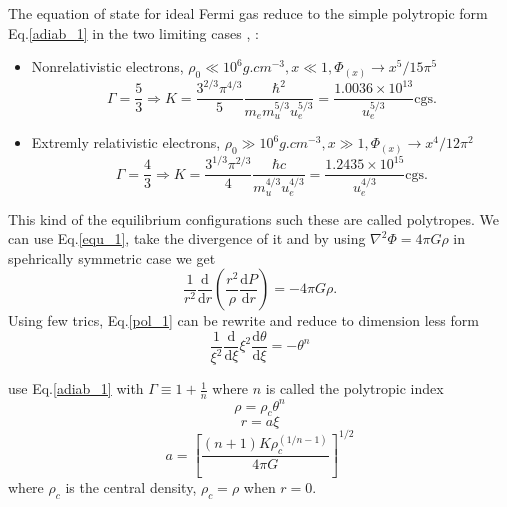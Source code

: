 \documentclass[oneside,a4paper,11pt]{report}
\begin{document}
The equation of state for ideal Fermi gas reduce to the simple polytropic form Eq.\eqref{adiab_1} in
the two limiting cases \citet{2004bhwd.book.....S}, \citet{padm_vII}:
\begin{itemize}
\item Nonrelativistic electrons, $\rho_0 \ll 10^6 g.cm^{-3}, x\ll 1, \Phi_{(x)}\rightarrow x^5/15\pi^5 $
\begin{equation}
\Gamma = \frac{5}{3} \Longrightarrow  K = \frac{3^{2/3}\pi^{4/3}}{5}\frac{\hbar^2}{m_em_u^{5/3}u_e^{5/3}} = \frac{1.0036\times 10^{13}}{u_e^{5/3}} \mathrm{cgs}.
\end{equation}
\item Extremly relativistic electrons, $\rho_0 \gg 10^6 g.cm^{-3}, x\gg 1, \Phi_{(x)}\rightarrow x^4/12\pi^2 $
\begin{equation}
\Gamma = \frac{4}{3} \Longrightarrow K = \frac{3^{1/3}\pi^{2/3}}{4}\frac{\hbar c}{m_u^{4/3}u_e^{4/3}} = \frac{1.2435\times 10^{15}}{u_e^{4/3}} \mathrm{cgs}.
\end{equation}
\end{itemize}

This kind of the equilibrium configurations such these are called polytropes. We can use Eq.\eqref{equ_1}, take the divergence of it and by using $\nabla^2\Phi = 4\pi G \rho$ in spehrically 
symmetric case we get  
\begin{equation}
\label{pol_1}
 \frac{1}{r^2}\frac{\mathrm{d}}{\mathrm{d}r}\left ( \frac{r^2}{\rho}\frac{\mathrm{d}P}{\mathrm{d}r} \right ) = -4\pi G\rho .
\end{equation}
Using few trics, Eq.\eqref{pol_1} can be rewrite and reduce to dimension less form 
\begin{equation}
 \label{pol_2}
\frac{1}{\xi^2 }\frac{\mathrm{d}}{\mathrm{d}\xi}\xi^2\frac{\mathrm{d}\theta }{\mathrm{d}\xi } = -\theta^n 
\end{equation}



use Eq.\eqref{adiab_1} with $\Gamma \equiv 1 + \frac{1}{n}$ where $n$ is called the polytropic index
\begin{equation}
\label{pol_3}
\rho = \rho_c \theta^n  
\end{equation}
\begin{equation}
\label{pol_4}
r = a\xi
\end{equation}
\begin{equation}
\label{pol_5} 
a = \left [ \frac{\left ( n+1 \right ) K \rho_c^{\left ( 1/n-1 \right )} }{4\pi G} \right ]^{1/2}
\end{equation}
where $\rho_c$ is the central density, $\rho_c = \rho$ when $r = 0$. 
\end{document}
